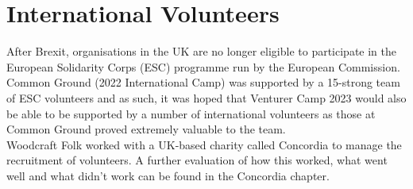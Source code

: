 \chapter{International Volunteers}
After Brexit, organisations in the UK are no longer eligible to participate in the European Solidarity Corps (ESC) programme run by the European Commission. Common Ground (2022 International Camp) was supported by a 15-strong team of ESC volunteers and as such, it was hoped that Venturer Camp 2023 would also be able to be supported by a number of international volunteers as those at Common Ground proved extremely valuable to the team.\\

Woodcraft Folk worked with a UK-based charity called Concordia to manage the recruitment of volunteers. A further evaluation of how this worked, what went well and what didn't work can be found in the Concordia chapter.
